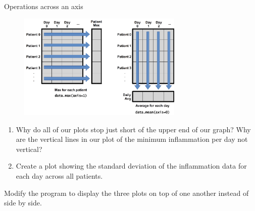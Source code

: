 \documentclass{beamer}
\begin{document}

\begin{frame}{Operations across an axis}

\begin{figure}[htbp]
   \centering
  \includegraphics[width=0.7\textwidth]{figs_slides/python-operations-across-axes.png} 
\end{figure}

\end{frame}



\begin{frame}{ }

\begin{enumerate}
   \item{ Why do all of our plots stop just short of the upper end of our graph? Why are the vertical lines in our plot of the minimum inflammation per day not vertical?}

   \item{ Create a plot showing the standard deviation of the inflammation data for each day across all patients.}
\end{enumerate}

\end{frame}


\begin{frame}{ }

Modify the program to display the three plots on top of one another instead of side by side.

\end{frame}

\end{document}
